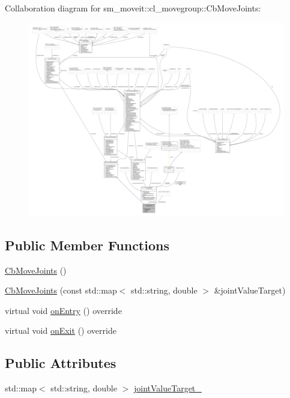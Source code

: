 Collaboration diagram for sm\+\_\+moveit\+:\+:cl\+\_\+movegroup\+:\+:Cb\+Move\+Joints\+:
\nopagebreak
\begin{figure}[H]
\begin{center}
\leavevmode
\includegraphics[width=350pt]{classsm__moveit_1_1cl__movegroup_1_1CbMoveJoints__coll__graph}
\end{center}
\end{figure}
\subsection*{Public Member Functions}
\begin{DoxyCompactItemize}
\item 
\hyperlink{classsm__moveit_1_1cl__movegroup_1_1CbMoveJoints_a96c0635e1afeee4d1f30143e35448046}{Cb\+Move\+Joints} ()
\item 
\hyperlink{classsm__moveit_1_1cl__movegroup_1_1CbMoveJoints_aa426dc0f46059268a7ddbcef2818f859}{Cb\+Move\+Joints} (const std\+::map$<$ std\+::string, double $>$ \&joint\+Value\+Target)
\item 
virtual void \hyperlink{classsm__moveit_1_1cl__movegroup_1_1CbMoveJoints_ad1e1c4dc0c27de67a96170d3d8ee1663}{on\+Entry} () override
\item 
virtual void \hyperlink{classsm__moveit_1_1cl__movegroup_1_1CbMoveJoints_a8214b71cd355ea281b9398c263d2a497}{on\+Exit} () override
\end{DoxyCompactItemize}
\subsection*{Public Attributes}
\begin{DoxyCompactItemize}
\item 
std\+::map$<$ std\+::string, double $>$ \hyperlink{classsm__moveit_1_1cl__movegroup_1_1CbMoveJoints_a86f4b67097288bcf5ccbe615751705d7}{joint\+Value\+Target\+\_\+}
\end{DoxyCompactItemize}
